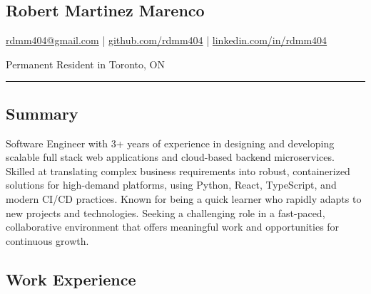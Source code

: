 \documentclass[a4paper,10pt]{article}
\begin{document}
\pagestyle{empty}

\begin{center}
  \section*{\LARGE Robert Martinez Marenco}
  \href{mailto:rdmm404@gmail.com}{rdmm404@gmail.com} |
  \href{https://github.com/rdmm404}{github.com/rdmm404} |
  \href{https://linkedin.com/in/rdmm404}{linkedin.com/in/rdmm404}

  Permanent Resident in Toronto, ON
\end{center}

\hrule
\vspace{4pt}

\subsection*{Summary}
Software Engineer with 3+ years of experience in designing and developing scalable full stack web applications
and cloud-based backend microservices. Skilled at translating complex business requirements into robust, containerized solutions
for high-demand platforms, using Python, React, TypeScript, and modern CI/CD practices. Known for being a quick learner
who rapidly adapts to new projects and technologies. Seeking a challenging role in a fast-paced,
collaborative environment that offers meaningful work and opportunities for continuous growth.
\subsection*{Work Experience}
\end{document}
